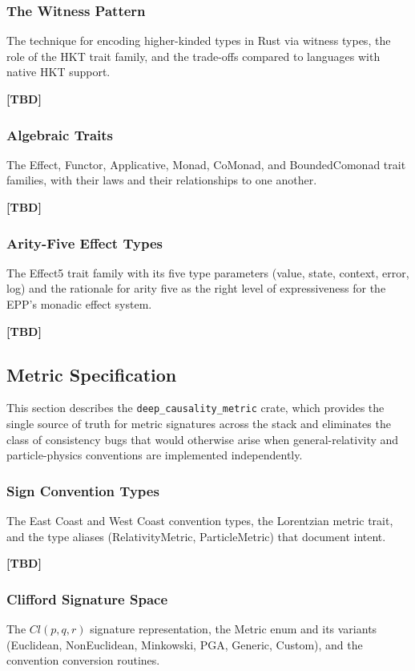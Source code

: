\subsubsection{The Witness Pattern}
The technique for encoding higher-kinded types in Rust via witness types, the role of the HKT trait family, and the trade-offs compared to languages with native HKT support.
 
\textbf{[TBD]}
 
\subsubsection{Algebraic Traits}
The Effect, Functor, Applicative, Monad, CoMonad, and BoundedComonad trait families, with their laws and their relationships to one another.
 
\textbf{[TBD]}
 
\subsubsection{Arity-Five Effect Types}
The Effect5 trait family with its five type parameters (value, state, context, error, log) and the rationale for arity five as the right level of expressiveness for the EPP's monadic effect system.
 
\textbf{[TBD]}
 
 
\subsection{Metric Specification}
\label{sec:implementation_metric}
 
This section describes the \texttt{deep\_causality\_metric} crate, which provides the single source of truth for metric signatures across the stack and eliminates the class of consistency bugs that would otherwise arise when general-relativity and particle-physics conventions are implemented independently.
 
\subsubsection{Sign Convention Types}
The East Coast and West Coast convention types, the Lorentzian metric trait, and the type aliases (RelativityMetric, ParticleMetric) that document intent.
 
\textbf{[TBD]}
 
\subsubsection{Clifford Signature Space}
The $Cl(p, q, r)$ signature representation, the Metric enum and its variants (Euclidean, NonEuclidean, Minkowski, PGA, Generic, Custom), and the convention conversion routines.
 
